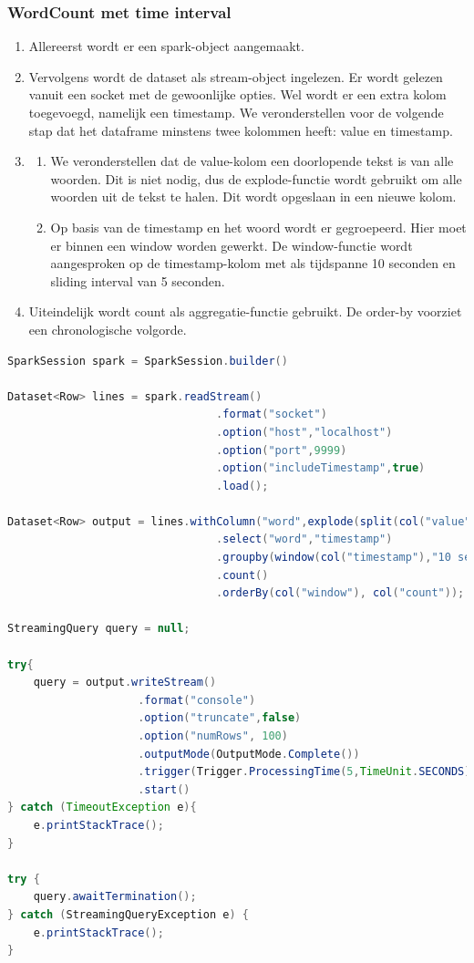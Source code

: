 \documentclass[a4paper,10pt,twoside]{report}
\begin{document}
\subsubsection{WordCount met time interval}

\begin{enumerate}
	\item Allereerst wordt er een spark-object aangemaakt.
	\item Vervolgens wordt de dataset als stream-object ingelezen. Er wordt gelezen vanuit een socket met de gewoonlijke opties. Wel wordt er een extra kolom toegevoegd, namelijk een timestamp. We veronderstellen voor de volgende stap dat het dataframe minstens twee kolommen heeft: value en timestamp.
	\item 
	\begin{enumerate}
		\item We veronderstellen dat de value-kolom een doorlopende tekst is van alle woorden. Dit is niet nodig, dus de explode-functie wordt gebruikt om alle woorden uit de tekst te halen. Dit wordt opgeslaan in een nieuwe kolom.
		\item Op basis van de timestamp en het woord wordt er gegroepeerd. Hier moet er binnen een window worden gewerkt. De window-functie wordt aangesproken op de timestamp-kolom met als tijdspanne 10 seconden en sliding interval van 5 seconden.
	\end{enumerate}
	\item Uiteindelijk wordt count als aggregatie-functie gebruikt. De order-by voorziet een chronologische volgorde.
\end{enumerate}

\begin{lstlisting}[language=Java]
SparkSession spark = SparkSession.builder()

Dataset<Row> lines = spark.readStream()
								.format("socket")
								.option("host","localhost")
								.option("port",9999)
								.option("includeTimestamp",true)
								.load();

Dataset<Row> output = lines.withColumn("word",explode(split(col("value"),"\\s")))
								.select("word","timestamp")
								.groupby(window(col("timestamp"),"10 seconds", "5 seconds"), col("word"))
								.count()
								.orderBy(col("window"), col("count"));			

StreamingQuery query = null;

try{
	query = output.writeStream()
					.format("console")
					.option("truncate",false)
					.option("numRows", 100)
					.outputMode(OutputMode.Complete())
					.trigger(Trigger.ProcessingTime(5,TimeUnit.SECONDS))
					.start()
} catch (TimeoutException e){
	e.printStackTrace();
}

try {
	query.awaitTermination();
} catch (StreamingQueryException e) {
	e.printStackTrace();
}
\end{lstlisting}
\end{document}
